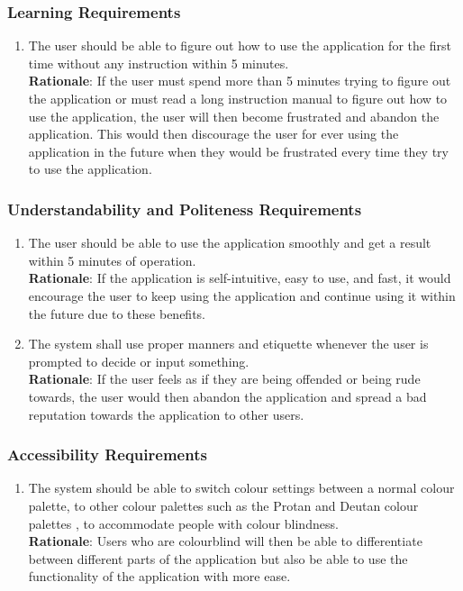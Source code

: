 \subsubsection{Learning Requirements}
\label{ssub:learning_requirements}
\begin{enumerate}[{UH-L}1. ]
	\item The user should be able to figure out how to use the application for the first time without any instruction within 5 minutes.
	\\ \textbf{Rationale}: If the user must spend more than 5 minutes trying to figure out the application or must read a long instruction manual to figure out how to use the application, the user will then become frustrated and abandon the application. This would then discourage the user for ever using the application in the future when they would be frustrated every time they try to use the application.	
\end{enumerate}

\subsubsection{Understandability and Politeness Requirements}
\label{ssub:understandability_and_politeness_requirements}
\begin{enumerate}[{UH-UP}1. ]
	\item The user should be able to use the application smoothly and get a result within 5 minutes of operation.
	\\ \textbf{Rationale}: If the application is self-intuitive, easy to use, and fast, it would encourage the user to keep using the application and continue using it within the future due to these benefits.
	\item The system shall use proper manners and etiquette whenever the user is prompted to decide or input something.
	\\ \textbf{Rationale}: If the user feels as if they are being offended or being rude towards, the user would then abandon the application and spread a bad reputation towards the application to other users.
\end{enumerate}


\subsubsection{Accessibility Requirements}
\label{ssub:accessibility_requirements}
\begin{enumerate}[{UH-A}1. ]
	\item The system should be able to switch colour settings between a normal colour palette, to other colour palettes such as the Protan and Deutan colour palettes \cite{4}, to accommodate people with colour blindness.
	\\ \textbf{Rationale}: Users who are colourblind will then be able to differentiate between different parts of the application but also be able to use the functionality of the application with more ease.
	
\end{enumerate}

